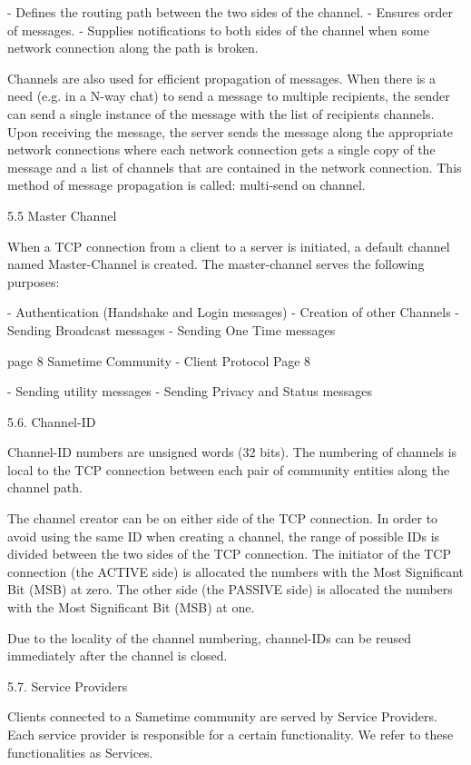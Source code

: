 \documentclass[titlepage,oneside]{book}
\begin{document}
- Defines the routing path between the two sides of the channel.
- Ensures order of messages.
- Supplies notifications to both sides of the channel when some network
connection along the path is broken.

Channels are also used for efficient propagation of messages. When
there is a need (e.g. in a N-way chat) to send a message to multiple
recipients, the sender can send a single instance of the message with
the list of recipients channels. Upon receiving the message, the server
sends the message along the appropriate network connections where each
network connection gets a single copy of the message and a list of
channels that are contained in the network connection. This method of
message propagation is called: multi-send on channel.

5.5 Master Channel

When a TCP connection from a client to a server is initiated, a default
channel named Master-Channel is created. The master-channel serves the
following purposes:

- Authentication (Handshake and Login messages)
- Creation of other Channels
- Sending Broadcast messages
- Sending One Time messages

page 8  Sametime Community - Client Protocol   Page 8

- Sending utility messages
- Sending Privacy and Status messages

5.6. Channel-ID

Channel-ID numbers are unsigned words (32 bits). The numbering of
channels is local to the TCP connection between each pair of community
entities along the channel path.

The channel creator can be on either side of the TCP connection. In
order to avoid using the same ID when creating a channel, the range of
possible IDs is divided between the two sides of the TCP connection.
The initiator of the TCP connection (the ACTIVE side) is allocated the
numbers with the Most Significant Bit (MSB) at zero. The other side
(the PASSIVE side) is allocated the numbers with the Most Significant
Bit (MSB) at one.

Due to the locality of the channel numbering, channel-IDs can be reused
immediately after the channel is closed.

5.7. Service Providers

Clients connected to a Sametime community are served by
Service Providers. Each service provider is responsible for a
certain functionality. We refer to these functionalities as Services.
\end{document}
